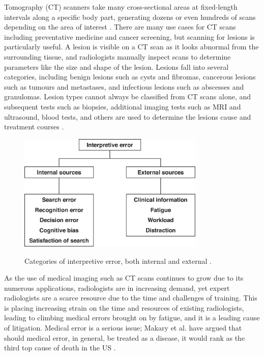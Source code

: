  Tomography (CT) scanners take many cross-sectional areas at fixed-length intervals along a specific body part, generating dozens or even hundreds of scans depending on the area of interest \cite{PMID:33620865}. There are many use cases for CT scans including preventative medicine and cancer screening, but scanning for lesions is particularly useful. A lesion is visible on a CT scan as it looks abnormal from the surrounding tissue, and radiologists manually inspect scans to determine parameters like the size and shape of the lesion. Lesions fall into several categories, including benign lesions such as cysts and fibromas, cancerous lesions such as tumours and metastases, and infectious lesions such as abscesses and granulomas. Lesion types cannot always be classified from CT scans alone, and subsequent tests such as biopsies, additional imaging tests such as MRI and ultrasound, blood tests, and others are used to determine the lesions cause and treatment courses \cite{oncology}.

\begin{figure}
 \begin{center}
 \includegraphics[width=3.5in]{images/scan_error.jpeg}\\
 \caption{Categories of interpretive error, both internal and external \cite{radiology_error}.}\label{interpret_error}
 \end{center}
\end{figure}

As the use of medical imaging such as CT scans continues to grow due to its numerous applications, radiologists are in increasing demand, yet expert radiologists are a scarce resource due to the time and challenges of training. This is placing increasing strain on the time and resources of existing radiologists, leading to climbing medical errors brought on by fatigue, and it is a leading cause of litigation. Medical error is a serious issue; Makary et al. have argued that should medical error, in general, be treated as a disease, it would rank as the third top cause of death in the US \cite{medical_error}. 

